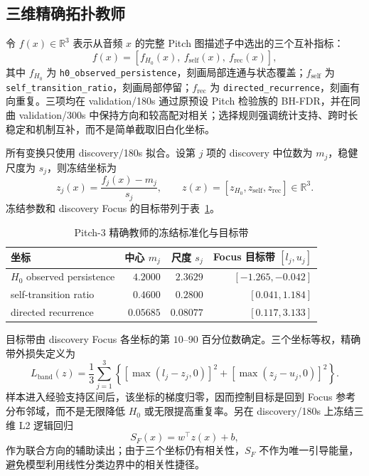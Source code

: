\documentclass{article}
\begin{document}
\subsection{三维精确拓扑教师}

令 $f(x)\in\mathbb R^3$ 表示从音频 $x$ 的完整 Pitch 图描述子中选出的三个互补指标：
\begin{equation}
f(x)=\left[
f_{H_0}(x),\ f_{\mathrm{self}}(x),\ f_{\mathrm{rec}}(x)
\right],
\end{equation}
其中 $f_{H_0}$ 为 \texttt{h0\_observed\_persistence}，刻画局部连通与状态覆盖；$f_{\mathrm{self}}$ 为 \texttt{self\_transition\_ratio}，刻画局部停留；$f_{\mathrm{rec}}$ 为 \texttt{directed\_recurrence}，刻画有向重复。三项均在 validation/180s 通过原预设 Pitch 检验族的 BH-FDR，并在同曲 validation/300s 中保持方向和较高配对相关；选择规则强调统计支持、跨时长稳定和机制互补，而不是简单截取旧白化坐标。

所有变换只使用 discovery/180s 拟合。设第 $j$ 项的 discovery 中位数为 $m_j$，稳健尺度为 $s_j$，则冻结坐标为
\begin{equation}
z_j(x)=\frac{f_j(x)-m_j}{s_j},\qquad
z(x)=[z_{H_0},z_{\mathrm{self}},z_{\mathrm{rec}}]\in\mathbb R^3.
\label{eq:pitch3_coordinate}
\end{equation}
冻结参数和 discovery Focus 的目标带列于表~\ref{tab:pitch3_contract}。

\begin{table}[htbp]
\centering
\caption{Pitch-3 精确教师的冻结标准化与目标带}
\label{tab:pitch3_contract}
\begin{tabular}{lrrr}
\toprule
坐标 & 中心 $m_j$ & 尺度 $s_j$ & Focus 目标带 $[l_j,u_j]$ \\
\midrule
$H_0$ observed persistence & $4.2000$ & $2.3629$ & $[-1.265,-0.042]$ \\
self-transition ratio      & $0.4600$ & $0.2800$ & $[0.041,1.184]$ \\
directed recurrence        & $0.05685$ & $0.08077$ & $[0.117,3.133]$ \\
\bottomrule
\end{tabular}
\end{table}

目标带由 discovery Focus 各坐标的第 $10$--$90$ 百分位数确定。三个坐标等权，精确带外损失定义为
\begin{equation}
L_{\mathrm{band}}(z)=\frac{1}{3}\sum_{j=1}^{3}
\left\{
[\max(l_j-z_j,0)]^2+[\max(z_j-u_j,0)]^2
\right\}.
\label{eq:pitch3_band_loss}
\end{equation}
样本进入经验支持区间后，该坐标的梯度归零，因而控制目标是回到 Focus 参考分布邻域，而不是无限降低 $H_0$ 或无限提高重复率。另在 discovery/180s 上冻结三维 L2 逻辑回归
\begin{equation}
S_F(x)=w^\top z(x)+b,
\end{equation}
作为联合方向的辅助读出；由于三个坐标仍有相关性，$S_F$ 不作为唯一引导能量，避免模型利用线性分类边界中的相关性捷径。
\end{document}
